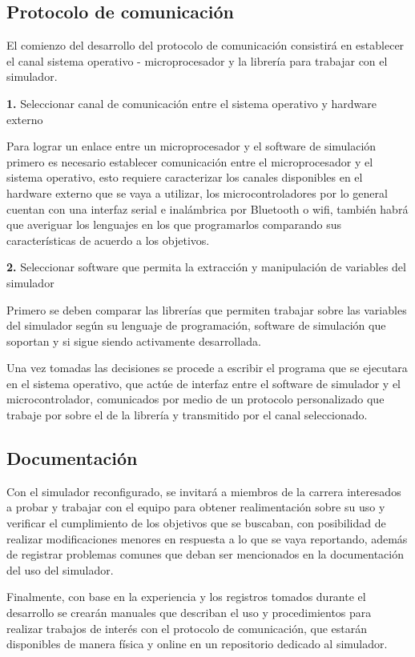 \subsection{Protocolo de comunicación}

El comienzo del desarrollo del protocolo de comunicación consistirá en establecer el canal sistema operativo - microprocesador y la librería para trabajar con el simulador.

\noindent
\textbf{1.} Seleccionar canal de comunicación entre el sistema operativo y hardware externo

Para lograr un enlace entre un microprocesador y el software de simulación primero es necesario establecer comunicación entre el microprocesador y el sistema operativo, esto requiere caracterizar los canales disponibles en el hardware externo que se vaya a utilizar, los microcontroladores por lo general cuentan con una interfaz serial e inalámbrica por Bluetooth o wifi, también habrá que averiguar los lenguajes en los que programarlos comparando sus características de acuerdo a los objetivos.

\noindent
\textbf{2.} Seleccionar software que permita la extracción y manipulación de variables del simulador

Primero se deben comparar las librerías que permiten trabajar sobre las variables del simulador según su lenguaje de programación, software de simulación que soportan y si sigue siendo activamente desarrollada.

Una vez tomadas las decisiones se procede a escribir el programa que se ejecutara en el sistema operativo, que actúe de interfaz entre el software de simulador y el microcontrolador, comunicados por medio de un protocolo personalizado que trabaje por sobre el de la librería y transmitido por el canal seleccionado.

\subsection{Documentación}

Con el simulador reconfigurado, se invitará a miembros de la carrera interesados a probar y trabajar con el equipo para obtener realimentación sobre su uso y verificar el cumplimiento de los objetivos que se buscaban, con posibilidad de realizar modificaciones menores en respuesta a lo que se vaya reportando, además de registrar problemas comunes que deban ser mencionados en la documentación del uso del simulador.

Finalmente, con base en la experiencia y los registros tomados durante el desarrollo se crearán manuales que describan el uso y procedimientos para realizar trabajos de interés con el protocolo de comunicación, que estarán disponibles de manera física y online en un repositorio dedicado al simulador.
